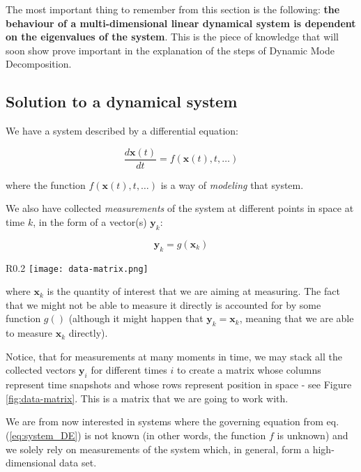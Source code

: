 \documentclass[10pt,twocolumn]{article}
\begin{document}
The most important thing to remember from this section is the following: \textbf{the behaviour of a multi-dimensional linear dynamical system is dependent on the eigenvalues of the system}. This is the piece of knowledge that will soon show prove important in the explanation of the steps of Dynamic Mode Decomposition.

\subsection{Solution to a dynamical system}

We have a system described by a differential equation:

\begin{equation} \label{eq:system_DE}
\frac{d \mathbf{x}(t)}{dt} = f(\mathbf{x}(t), t, \dots)
\end{equation}

where the function $f(\mathbf{x}(t), t, \dots)$ is a way of \textit{modeling} that system.

We also have collected \textit{measurements} of the system at different points in space at time $k$, in the form of a vector(s) $\mathbf{\mathbf{y}}_k$:

\begin{equation}
\mathbf{\mathbf{y}}_k = g(\mathbf{x}_k)
\end{equation}

\begin{wrapfigure}{R}{0.2\textwidth}
\centering\texttt{[image: data-matrix.png]}
\caption{Data matrix with measurements of the system.}
\label{fig:data-matrix}
\end{wrapfigure}

where $\mathbf{x}_k$ is the quantity of interest that we are aiming at measuring. The fact that we might not be able to measure it directly is accounted for by some function $g()$ (although it might happen that $\mathbf{y}_k = \mathbf{x}_k$, meaning that we are able to measure $\mathbf{x}_k$ directly).

Notice, that for measurements at many moments in time, we may stack all the collected vectors $\mathbf{y}_i$ for different times $i$ to create a matrix whose columns represent time snapshots and whose rows represent position in space - see Figure \ref{fig:data-matrix}. This is a matrix that we are going to work with.

We are from now interested in systems where the governing equation from eq.(\ref{eq:system_DE}) is not known (in other words, the function $f$ is unknown) and we solely rely on measurements of the system which, in general, form a high-dimensional data set.
\end{document}
